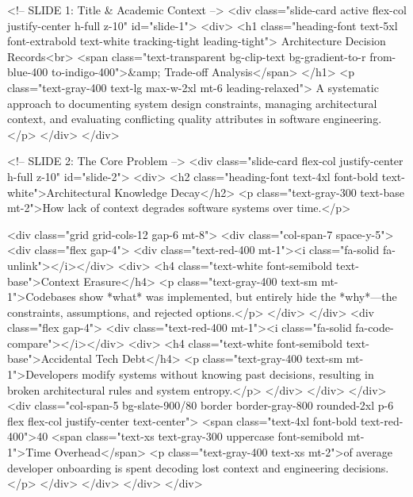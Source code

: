             <!-- SLIDE 1: Title & Academic Context -->
            <div class="slide-card active flex-col justify-center h-full z-10" id="slide-1">
                <div>
                    <h1 class="heading-font text-5xl font-extrabold text-white tracking-tight leading-tight">
                        Architecture Decision Records<br>
                        <span class="text-transparent bg-clip-text bg-gradient-to-r from-blue-400 to-indigo-400">&amp; Trade-off Analysis</span>
                    </h1>
                    <p class="text-gray-400 text-lg max-w-2xl mt-6 leading-relaxed">
                        A systematic approach to documenting system design constraints, managing architectural context, and evaluating conflicting quality attributes in software engineering.
                    </p>
                </div>
            </div>

            <!-- SLIDE 2: The Core Problem -->
            <div class="slide-card flex-col justify-center h-full z-10" id="slide-2">
                <div>
                    <h2 class="heading-font text-4xl font-bold text-white">Architectural Knowledge Decay</h2>
                    <p class="text-gray-300 text-base mt-2">How lack of context degrades software systems over time.</p>
                    
                    <div class="grid grid-cols-12 gap-6 mt-8">
                        <div class="col-span-7 space-y-5">
                            <div class="flex gap-4">
                                <div class="text-red-400 mt-1"><i class="fa-solid fa-unlink"></i></div>
                                <div>
                                    <h4 class="text-white font-semibold text-base">Context Erasure</h4>
                                    <p class="text-gray-400 text-sm mt-1">Codebases show *what* was implemented, but entirely hide the *why*—the constraints, assumptions, and rejected options.</p>
                                </div>
                            </div>
                            <div class="flex gap-4">
                                <div class="text-red-400 mt-1"><i class="fa-solid fa-code-compare"></i></div>
                                <div>
                                    <h4 class="text-white font-semibold text-base">Accidental Tech Debt</h4>
                                    <p class="text-gray-400 text-sm mt-1">Developers modify systems without knowing past decisions, resulting in broken architectural rules and system entropy.</p>
                                </div>
                            </div>
                        </div>
                        <div class="col-span-5 bg-slate-900/80 border border-gray-800 rounded-2xl p-6 flex flex-col justify-center text-center">
                            <span class="text-4xl font-bold text-red-400">40%
                            <span class="text-xs text-gray-300 uppercase font-semibold mt-1">Time Overhead</span>
                            <p class="text-gray-400 text-xs mt-2">of average developer onboarding is spent decoding lost context and engineering decisions.</p>
                        </div>
                    </div>
                </div>
            </div>

